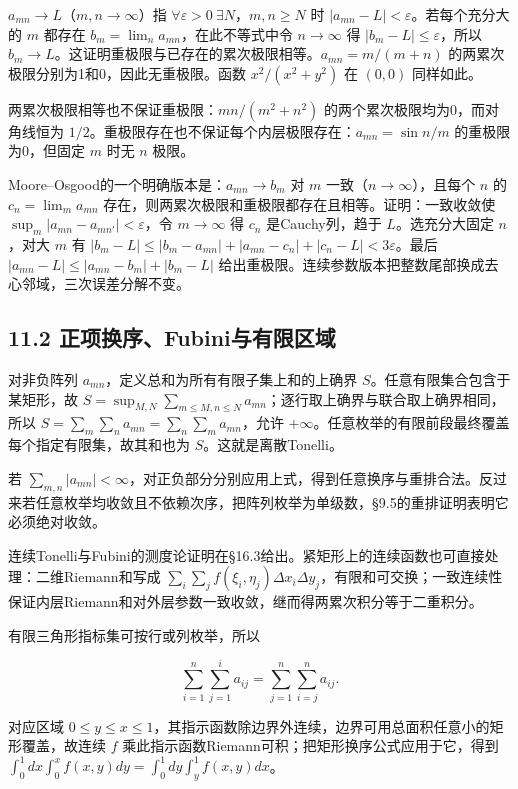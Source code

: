 \documentclass[11pt,a4paper]{article}
\begin{document}
\(a_{mn}\to L\)（\(m,n\to\infty\)）指
\(\forall\varepsilon>0\ \exists N\)，\(m,n\ge N\) 时
\(|a_{mn}-L|<\varepsilon\)。若每个充分大的 \(m\) 都存在
\(b_m=\lim_na_{mn}\)，在此不等式中令 \(n\to\infty\) 得
\(|b_m-L|\le\varepsilon\)，所以
\(b_m\to L\)。这证明重极限与已存在的累次极限相等。\(a_{mn}=m/(m+n)\)
的两累次极限分别为1和0，因此无重极限。函数 \(x^2/(x^2+y^2)\) 在
\((0,0)\) 同样如此。

两累次极限相等也不保证重极限：\(mn/(m^2+n^2)\)
的两个累次极限均为0，而对角线恒为
\(1/2\)。重极限存在也不保证每个内层极限存在：\(a_{mn}=\sin n/m\)
的重极限为0，但固定 \(m\) 时无 \(n\) 极限。

Moore--Osgood的一个明确版本是：\(a_{mn}\to b_m\) 对 \(m\)
一致（\(n\to\infty\)），且每个 \(n\) 的 \(c_n=\lim_ma_{mn}\)
存在，则两累次极限和重极限都存在且相等。证明：一致收敛使
\(\sup_m|a_{mn}-a_{mn'}|<\varepsilon\)，令 \(m\to\infty\) 得 \(c_n\)
是Cauchy列，趋于 \(L\)。选充分大固定 \(n\)，对大 \(m\) 有
\(|b_m-L|\le|b_m-a_{mn}|+|a_{mn}-c_n|+|c_n-L|<3\varepsilon\)。最后
\(|a_{mn}-L|\le|a_{mn}-b_m|+|b_m-L|\)
给出重极限。连续参数版本把整数尾部换成去心邻域，三次误差分解不变。

\subsection{11.2
正项换序、Fubini与有限区域}\label{ux6b63ux9879ux6362ux5e8ffubiniux4e0eux6709ux9650ux533aux57df}

对非负阵列 \(a_{mn}\)，定义总和为所有有限子集上和的上确界
\(S\)。任意有限集合包含于某矩形，故
\(S=\sup_{M,N}\sum_{m\le M,n\le N}a_{mn}\)；逐行取上确界与联合取上确界相同，所以
\(S=\sum_m\sum_na_{mn}=\sum_n\sum_ma_{mn}\)，允许
\(+\infty\)。任意枚举的有限前段最终覆盖每个指定有限集，故其和也为
\(S\)。这就是离散Tonelli。

若
\(\sum_{m,n}|a_{mn}|<\infty\)，对正负部分分别应用上式，得到任意换序与重排合法。反过来若任意枚举均收敛且不依赖次序，把阵列枚举为单级数，§9.5的重排证明表明它必须绝对收敛。

连续Tonelli与Fubini的测度论证明在§16.3给出。紧矩形上的连续函数也可直接处理：二维Riemann和写成
\(\sum_i\sum_jf(\xi_i,\eta_j)\Delta x_i\Delta y_j\)，有限和可交换；一致连续性保证内层Riemann和对外层参数一致收敛，继而得两累次积分等于二重积分。

有限三角形指标集可按行或列枚举，所以

\[
\sum_{i=1}^n\sum_{j=1}^ia_{ij}=\sum_{j=1}^n\sum_{i=j}^na_{ij}.
\]

对应区域
\(0\le y\le x\le1\)，其指示函数除边界外连续，边界可用总面积任意小的矩形覆盖，故连续
\(f\) 乘此指示函数Riemann可积；把矩形换序公式应用于它，得到
\(\int_0^1dx\int_0^xf(x,y)dy=\int_0^1dy\int_y^1f(x,y)dx\)。
\end{document}
